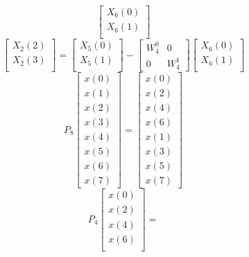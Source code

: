 \documentclass[journal,12pt,twocolumn]{IEEEtran}
\renewcommand\thesection{\arabic{section}}
\begin{document}
\begin{enumerate}[label=\thesection.\arabic*]
\begin{equation}
\begin{bmatrix}
X_{6}(0) \\ 
X_{6}(1) \\ 
\end{bmatrix}
\label{eq:4-2-high}
\end{equation}
\begin{equation}
\begin{bmatrix}
X_{2}(2) \\ 
X_{2}(3)\\ 
\end{bmatrix}
=
\begin{bmatrix}
X_{5}(0) \\ 
X_{5}(1)\\ 
\end{bmatrix}
-
\begin{bmatrix}
W^{0}_{4} & 0\\
0 & W^{1}_{4}
\end{bmatrix}
\begin{bmatrix}
X_{6}(0) \\ 
X_{6}(1) \\ 
\end{bmatrix}
\label{eq:4-2-low}
\end{equation}
\begin{equation}
P_{8}
\begin{bmatrix}
x(0) \\ 
x(1) \\ 
x(2) \\ 
x(3) \\ 
x(4) \\ 
x(5) \\
x(6) \\
x(7)
\end{bmatrix}
 = 
\begin{bmatrix}
x(0) \\ 
x(2) \\ 
x(4) \\ 
x(6) \\
x(1) \\ 
x(3) \\ 
x(5) \\
x(7)
\end{bmatrix}
\end{equation}
\begin{equation}
P_{4}
\begin{bmatrix}
x(0) \\ 
x(2) \\ 
x(4) \\ 
x(6) \\
\end{bmatrix}
 = 

\end{equation}
\end{enumerate}
\end{document}
